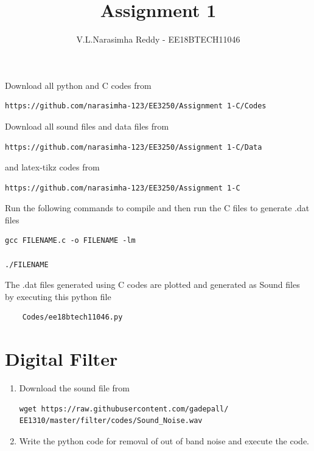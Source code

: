 \documentclass[journal,12pt,twocolumn]{IEEEtran}
\renewcommand\thesection{\arabic{section}}
\begin{document}
\def\putbox#1#2#3{\makebox[0in][l]{\makebox[#1][l]{}\raisebox{\baselineskip}[0in][0in]{\raisebox{#2}[0in][0in]{#3}}}}
     \def\rightbox#1{\makebox[0in][r]{#1}}
     \def\centbox#1{\makebox[0in]{#1}}
     \def\topbox#1{\raisebox{-\baselineskip}[0in][0in]{#1}}
     \def\midbox#1{\raisebox{-0.5\baselineskip}[0in][0in]{#1}}
\vspace{3cm}
\title{Assignment 1}
\author{V.L.Narasimha Reddy - EE18BTECH11046}
\maketitle
\newpage
\renewcommand{\thefigure}{\theenumi}
\renewcommand{\thetable}{\theenumi}
\bigskip
Download all python and C codes from 
\begin{lstlisting}
https://github.com/narasimha-123/EE3250/Assignment 1-C/Codes
\end{lstlisting}
Download all sound files and data files from 
\begin{lstlisting}
https://github.com/narasimha-123/EE3250/Assignment 1-C/Data
\end{lstlisting}
%
and latex-tikz codes from 
%
\begin{lstlisting}
https://github.com/narasimha-123/EE3250/Assignment 1-C
\end{lstlisting}
Run the following commands to compile and then run the C files to generate .dat files
\begin{lstlisting}
gcc FILENAME.c -o FILENAME -lm

./FILENAME
\end{lstlisting}

The .dat files generated using C codes are plotted and generated as Sound files by executing this python file
\begin{lstlisting}
    Codes/ee18btech11046.py
\end{lstlisting}

\section{Digital Filter}
\begin{enumerate}[label=\thesection.\arabic*
,ref=\thesection.\theenumi]
\item
\label{prob:input}
Download the sound file from  
\begin{lstlisting}
wget https://raw.githubusercontent.com/gadepall/ 
EE1310/master/filter/codes/Sound_Noise.wav
\end{lstlisting}
\item
\label{prob:output}
Write the python code for removal of out of band noise and execute the code.
\\
\solution


\end{enumerate}
\end{document}

